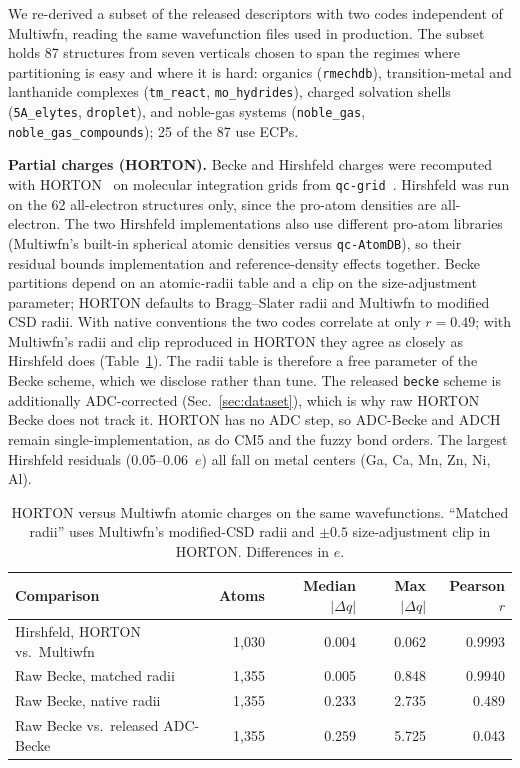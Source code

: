 We re-derived a subset of the released descriptors with two codes independent of
Multiwfn, reading the same wavefunction files used in production. The subset holds 87
structures from seven verticals chosen to span the regimes where partitioning is easy and
where it is hard: organics (\texttt{rmechdb}), transition-metal and lanthanide complexes
(\texttt{tm\_react}, \texttt{mo\_hydrides}), charged solvation shells
(\texttt{5A\_elytes}, \texttt{droplet}), and noble-gas systems (\texttt{noble\_gas},
\texttt{noble\_gas\_compounds}); 25 of the 87 use ECPs.

\textbf{Partial charges (HORTON).} Becke and Hirshfeld charges were recomputed with
HORTON~\citep{horton} on molecular integration grids from \texttt{qc-grid}~\citep{qcgrid}.
Hirshfeld was run on the 62 all-electron structures only, since the pro-atom densities are
all-electron. The two Hirshfeld implementations also use different pro-atom libraries
(Multiwfn's built-in spherical atomic densities versus \texttt{qc-AtomDB}), so their residual
bounds implementation and reference-density effects together. Becke partitions depend on an
atomic-radii table and a clip on the size-adjustment parameter; HORTON defaults to
Bragg--Slater radii and Multiwfn to modified CSD radii. With native conventions the two codes
correlate at only $r=0.49$; with Multiwfn's radii and clip reproduced in HORTON they agree
as closely as Hirshfeld does (Table~\ref{tab:xval_charges}). The radii table is therefore a
free parameter of the Becke scheme, which we disclose rather than tune. The released
\texttt{becke} scheme is additionally ADC-corrected (Sec.~\ref{sec:dataset}), which is why
raw HORTON Becke does not track it. HORTON has no ADC step, so ADC-Becke and ADCH remain
single-implementation, as do CM5 and the fuzzy bond orders. The largest Hirshfeld
residuals (0.05--0.06~$e$) all fall on metal centers (Ga, Ca, Mn, Zn, Ni, Al).

\begin{table}[h]
\centering
\small
\caption{HORTON versus Multiwfn atomic charges on the same wavefunctions. ``Matched radii''
uses Multiwfn's modified-CSD radii and $\pm0.5$ size-adjustment clip in HORTON. Differences in $e$.}
\label{tab:xval_charges}
\begin{tabular}{lrrrr}
\toprule
Comparison & Atoms & Median $|\Delta q|$ & Max $|\Delta q|$ & Pearson $r$ \\
\midrule
Hirshfeld, HORTON vs.\ Multiwfn          & 1{,}030 & 0.004 & 0.062 & 0.9993 \\
Raw Becke, matched radii                 & 1{,}355 & 0.005 & 0.848 & 0.9940 \\
Raw Becke, native radii                  & 1{,}355 & 0.233 & 2.735 & 0.489 \\
Raw Becke vs.\ released ADC-Becke & 1{,}355 & 0.259 & 5.725 & 0.043 \\
\bottomrule
\end{tabular}
\end{table}

